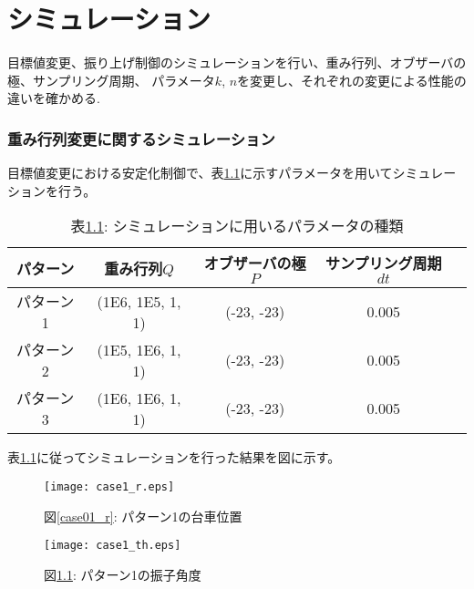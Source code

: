 \chapter{シミュレーション}
目標値変更、振り上げ制御のシミュレーションを行い、重み行列、オブザーバの極、サンプリング周期、
パラメータ$k$, $n$を変更し、それぞれの変更による性能の違いを確かめる.

\subsection{重み行列変更に関するシミュレーション}
目標値変更における安定化制御で、表\ref{sim_Q}に示すパラメータを用いてシミュレーションを行う。

\begin{table}[htbp]
    \begin{center}
        \caption{表\ref{sim_Q}: シミュレーションに用いるパラメータの種類}
        \begin{tabular}{|c|c|c|c|c|} \hline
            パターン & 重み行列$Q$ & オブザーバの極$P$ & サンプリング周期$dt$ \\ \hline \hline
            パターン1 & (1E6, 1E5, 1, 1) & (-23, -23) & 0.005 \\ \hline
            パターン2 & (1E5, 1E6, 1, 1) & (-23, -23) & 0.005 \\ \hline
            パターン3 & (1E6, 1E6, 1, 1) & (-23, -23) & 0.005 \\ \hline
        \end{tabular}
        \label{sim_Q}
    \end{center}
\end{table}

表\ref{sim_Q}に従ってシミュレーションを行った結果を図に示す。

\begin{figure}[htbp]
    \begin{minipage}{0.5\hsize}
        \begin{center}
            \texttt{[image: case1\_r.eps]}
            \caption{図\ref{case01_r}: パターン1の台車位置}
            \label{case01_r}
        \end{center}
    \end{minipage}
    \begin{minipage}{0.5\hsize}
        \begin{center}
            \texttt{[image: case1\_th.eps]}
            \caption{図\ref{case01_th}: パターン1の振子角度}
            \label{case01_th}
        \end{center}
    \end{minipage}
\end{figure}

